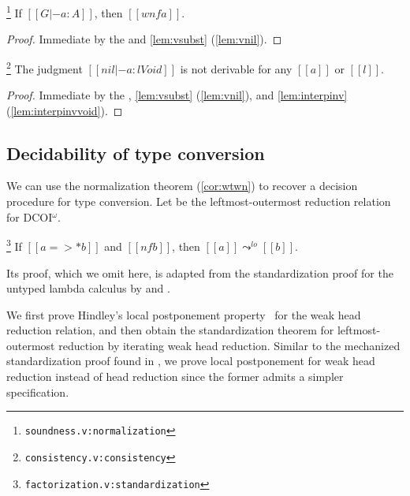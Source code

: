 \documentclass[acmsmall, screen=true, nonacm=true,
  review=\ifpublic false\else true\fi,
  anonymous=\ifanonymous true\else false\fi
]{acmart}
\makeatletter
\newcommand{\name}{\texorpdfstring{DCOI$^{\omega}$\@\xspace}{DCOI-omega}}
\newcommand{\suppl}[3]{{\scriptsize\texttt{#2:#3}}}
\newcommand{\judgement}[1]{{\setlength{\fboxsep}{1.5pt}\fbox{#1}}}
\newlength{\punctwidth}
\newcommand{\stack}[1]{%
  \settowidth{\punctwidth}{#1}%
  \hspace*{-\the\punctwidth}%
}
\makeatother
\begin{document}
\begin{corollary}
  \stack{.~}\footnote{\suppl{theories}{soundness.v}{normalization}}
  \label{cor:wtwn}
  If $[[G |- a : A]]$, then $[[wnf a]]$.
\end{corollary}
\begin{proof}
  Immediate by the  and \cref{lem:vsubst} (\ref{lem:vnil}).
\end{proof}

\begin{corollary}
  \stack{.~}\footnote{\suppl{theories}{consistency.v}{consistency}}
  The judgment $[[nil |- a : l Void]]$ is not derivable for any
  $[[a]]$ or $[[l]]$.
\end{corollary}
\begin{proof}
  Immediate by the , \cref{lem:vsubst}
  (\ref{lem:vnil}), and \cref{lem:interpinv} (\ref{lem:interpinvvoid}).
\end{proof}

\subsection{Decidability of type conversion}
\label{sec:decconv}

We can use the normalization theorem
(\cref{cor:wtwn}) to recover a decision procedure for type
conversion.
Let \judgement{$a \leadsto^{lo} b$} be the
leftmost-outermost reduction relation for \name.


\begin{lemma}[Standardization]
  \stack{.~}\footnote{\suppl{theories}{factorization.v}{standardization}}
  \label{lem:standardization}
  If $[[a =>* b]]$ and $[[nf b]]$, then $[[a]]\leadsto^{lo}[[b]]$.
\end{lemma}

Its proof, which we omit here,
is adapted from the standardization proof for the untyped lambda
calculus by \citet{takahashi:par} and \citet{accattoli:factorization}.

\ifextended
We first prove Hindley's local postponement property~\citep{accattoli:factorization}
for the weak head reduction relation, and then obtain the
standardization theorem for leftmost-outermost reduction by iterating
weak head reduction. Similar to the mechanized standardization proof
found in \citet{mckinna:some-lambda-formalized}, we prove local
postponement for weak head reduction instead of head reduction since
the former admits a simpler specification.
\fi
\end{document}
